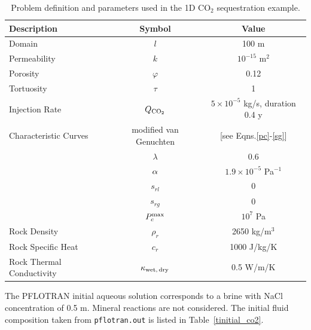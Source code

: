 \begin{table}[h]\centering
\caption{Problem definition and parameters used in the 1D CO$_2$ sequestration example.}
\label{tco2}
\vspace{3mm}
\begin{tabular}{lcc}
\toprule
Description & Symbol & Value\\
\midrule
Domain & $l$ & 100 m\\
Permeability & $k$ & $10^{-15}$ m$^2$\\
Porosity & $\varphi$ & 0.12\\
Tortuosity & $\tau$ & 1\\
Injection Rate & $Q_{\rm CO_2}$ & $5\times 10^{-5}$ kg/s, duration 0.4 y\\
Characteristic Curves & modified van Genuchten & [see Eqns.\eqref{pc}-\eqref{sg}]\\
& $\lambda$ & 0.6\\
& ${\alpha}$ & $1.9 \times 10^{-5}$ Pa$^{-1}$\\
& $s_{rl}$ & 0\\
& $s_{rg}$ & 0\\
& $P_c^{\rm max}$ & $10^7$ Pa\\
Rock Density & $\rho_r$ & 2650 kg/m$^3$\\
Rock Specific Heat & $c_r$ & 1000 J/kg/K\\
Rock Thermal Conductivity & $\kappa_{\rm wet,\,dry}$ & 0.5 W/m/K\\
\bottomrule
\end{tabular}
\end{table}

The PFLOTRAN initial aqueous solution corresponds to a brine with NaCl concentration of 0.5 m. Mineral reactions are not considered. The initial fluid composition taken from {\tt pflotran.out} is listed in Table~\ref{tinitial_co2}.

